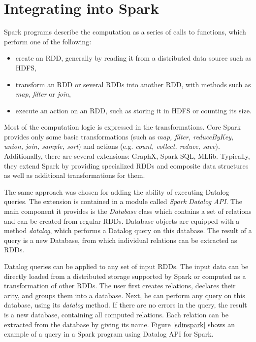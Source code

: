 \section{Integrating \datalogra into Spark}

Spark programs describe the computation as a series of calls to functions, which perform one of the following:
\begin{itemize}
  \item create an RDD, generally by reading it from a distributed data source such as HDFS,
  \item transform an RDD or several RDDs into another RDD, with methods such as \emph{map}, \emph{filter} or \emph{join},
  \item execute an action on an RDD, such as storing it in HDFS or counting its size.
\end{itemize}

Most of the computation logic is expressed in the transformations.  Core Spark provides only some basic transformations (such as \emph{map, filter, reduceByKey, union, join, sample, sort}) and actions (e.g. \emph{count, collect, reduce, save}). Additionally, there are several extensions: GraphX, Spark SQL, MLlib. Typically, they extend Spark by providing specialized RDDs and composite data structures as well as additional transformations for them.

The same approach was chosen for adding the ability of executing Datalog queries. The extension is contained in a module called \emph{Spark Datalog API}. The main component it provides is the \emph{Database} class which contains a set of relations and can be created from regular RDDs. Database objects are equipped with a method \emph{datalog}, which performs a Datalog query on this database. The result of a query is a new Database, from which individual relations can be extracted as RDDs. 

Datalog queries can be applied to any set of input RDDs. The input data can be directly loaded from a distributed storage supported by Spark or computed as a transformation of other RDDs. The user first creates relations, declares their arity, and groups them into a database. Next, he can perform any query on this database, using its \emph{datalog} method. If there are no errors in the query, the result is a new database, containing all computed relations. Each relation can be extracted from the database by giving its name. Figure \ref{sdinspark} shows an example of a \datalogra query in a Spark program using Datalog API for Spark.

